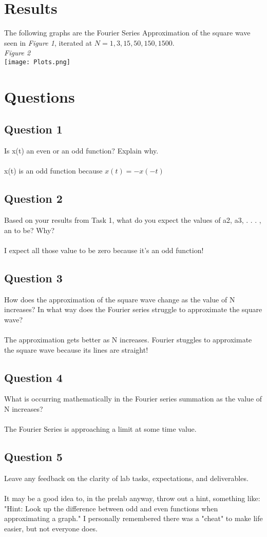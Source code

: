 \documentclass[12pt,a4paper]{article}
\begin{document}
\section{Results}
The following graphs are the Fourier Series Approximation of the square wave seen in \textit{Figure 1}, iterated at $N={1,3,15,50,150,1500}$.
\\
\textit{Figure 2}
\\
\texttt{[image: Plots.png]}
\newpage
\section{Questions}
\subsection{Question 1}
Is x(t) an even or an odd function? Explain why.\\
\\
x(t) is an odd function because $x(t)=-x(-t)$\\
\subsection{Question 2}
Based on your results from Task 1, what do you expect the values of a2, a3, . . . , an to be? Why?\\
\\
I expect all those value to be zero because it's an odd function!
\subsection{Question 3}
How does the approximation of the square wave change as the value of N increases? In what way does the Fourier series struggle to approximate the square wave?\\
\\
The approximation gets better as N increases. Fourier stuggles to approximate the square wave because its lines are straight!
\subsection{Question 4}
What is occurring mathematically in the Fourier series summation as the value of N increases?\\
\\
The Fourier Series is approaching a limit at some time value.\\
\subsection{Question 5}
Leave any feedback on the clarity of lab tasks, expectations, and deliverables.\\
\\
It may be a good idea to, in the prelab anyway, throw out a hint, something like: "Hint: Look up the difference between odd and even functions when approximating a graph." I personally remembered there was a "cheat" to make life easier, but not everyone does.
\end{document}
